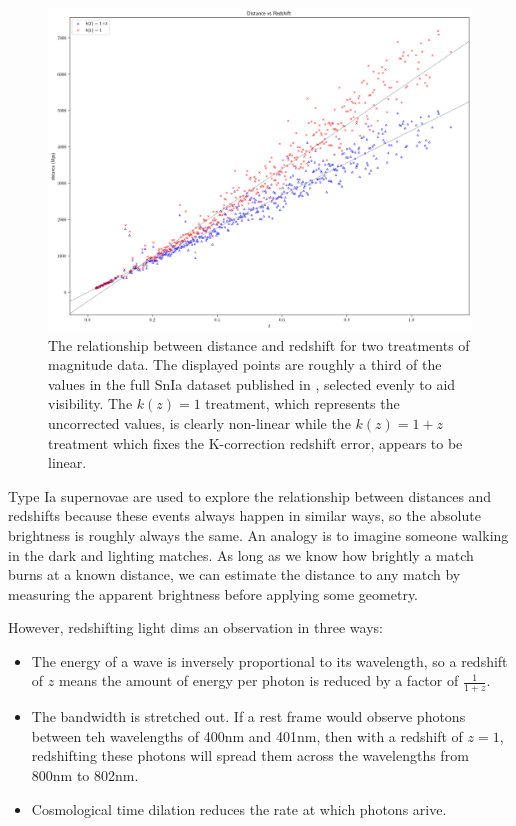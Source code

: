 \documentclass[linenumbers]{aastex631}
\begin{document}
\begin{figure}
  \includegraphics[width=\linewidth]{mu_distance_vs_redshift.png}
  \caption{The relationship between distance and redshift for two treatments of
  magnitude data. The displayed points are roughly a third of the values in the
  full SnIa dataset published in \citet{abbott2024}, selected evenly to aid
  visibility. The $k(z) = 1$ treatment, which represents the uncorrected
  values, is clearly non-linear while the $k(z) = 1 + z$ treatment which fixes
  the K-correction redshift error, appears to be linear.}
  \label{fig:mu_distance_vs_redshift}
\end{figure}

Type Ia supernovae are used to explore the relationship between distances and
redshifts because these events always happen in similar ways, so the absolute
brightness is roughly always the same. An analogy is to imagine someone walking
in the dark and lighting matches. As long as we know how brightly a match burns
at a known distance, we can estimate the distance to any match by measuring the
apparent brightness before applying some geometry.

However, redshifting light dims an observation in three ways:

\begin{itemize}
  \item The energy of a wave is inversely proportional to its wavelength, so a
  redshift of $z$ means the amount of energy per photon is reduced by a factor
  of $\frac{1}{1+z}$.

  \item The bandwidth is stretched out. If a rest frame would observe photons
  between teh wavelengths of 400nm and 401nm, then with a redshift of $z = 1$,
  redshifting these photons will spread them across the wavelengths from 800nm
  to 802nm.

  \item Cosmological time dilation reduces the rate at which photons arive.
\end{itemize}
\end{document}
